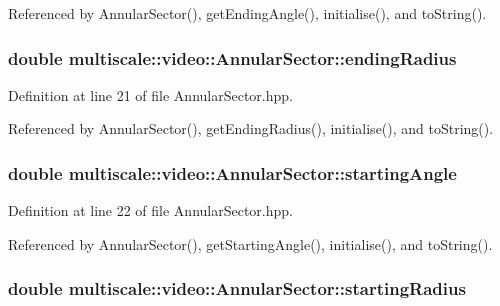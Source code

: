 Referenced by Annular\-Sector(), get\-Ending\-Angle(), initialise(), and to\-String().

\hypertarget{classmultiscale_1_1video_1_1AnnularSector_aa45c5399240707d0b3fc02ee86b97c79}{
\subsubsection[{ending\-Radius}]{\setlength{\rightskip}{0pt plus 5cm}double multiscale\-::video\-::\-Annular\-Sector\-::ending\-Radius\hspace{0.3cm}{\ttfamily [private]}}}\label{classmultiscale_1_1video_1_1AnnularSector_aa45c5399240707d0b3fc02ee86b97c79}


Definition at line 21 of file Annular\-Sector.\-hpp.



Referenced by Annular\-Sector(), get\-Ending\-Radius(), initialise(), and to\-String().

\hypertarget{classmultiscale_1_1video_1_1AnnularSector_a437d3dc1b2fadace28bdc3d26a78c0b3}{
\subsubsection[{starting\-Angle}]{\setlength{\rightskip}{0pt plus 5cm}double multiscale\-::video\-::\-Annular\-Sector\-::starting\-Angle\hspace{0.3cm}{\ttfamily [private]}}}\label{classmultiscale_1_1video_1_1AnnularSector_a437d3dc1b2fadace28bdc3d26a78c0b3}


Definition at line 22 of file Annular\-Sector.\-hpp.



Referenced by Annular\-Sector(), get\-Starting\-Angle(), initialise(), and to\-String().

\hypertarget{classmultiscale_1_1video_1_1AnnularSector_a4c0094d8993edb40b15580fa58a8a393}{
\subsubsection[{starting\-Radius}]{\setlength{\rightskip}{0pt plus 5cm}double multiscale\-::video\-::\-Annular\-Sector\-::starting\-Radius\hspace{0.3cm}{\ttfamily [private]}}}\label{classmultiscale_1_1video_1_1AnnularSector_a4c0094d8993edb40b15580fa58a8a393}


